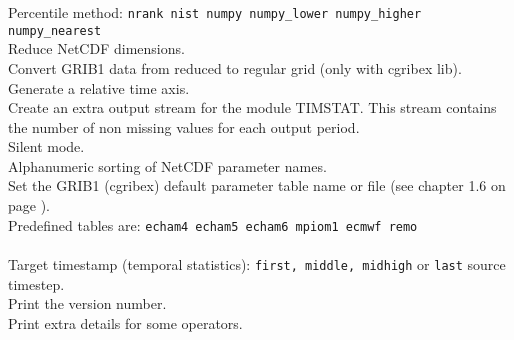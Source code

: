 \begin{tabbing}
\makebox[1.5in][l]{\hspace*{1cm}}
         \> Percentile method: \texttt{nrank nist numpy numpy\_lower numpy\_higher numpy\_nearest} \\
         \> Reduce NetCDF dimensions. \\
         \> Convert GRIB1 data from reduced to regular grid (only with cgribex lib). \\
         \> Generate a relative time axis. \\
         \> Create an extra output stream for the module TIMSTAT. This stream contains  \\
         \> the number of non missing values for each output period. \\
         \> Silent mode. \\
         \> Alphanumeric sorting of NetCDF parameter names. \\
         \> Set the GRIB1 (cgribex) default parameter table name or file (see chapter 1.6 on page \pageref{PARAMETER_TABLE}).\\
         \> Predefined tables are:  \texttt{echam4 echam5 echam6 mpiom1 ecmwf remo}\\
         \> \\
\makebox[1.5in][l]{\hspace*{1cm}}
         \> Target timestamp (temporal statistics): \texttt{first, middle, midhigh} or \texttt{last} source timestep. \\
         \> Print the version number. \\
         \> Print extra details for some operators. \\

\end{tabbing}
